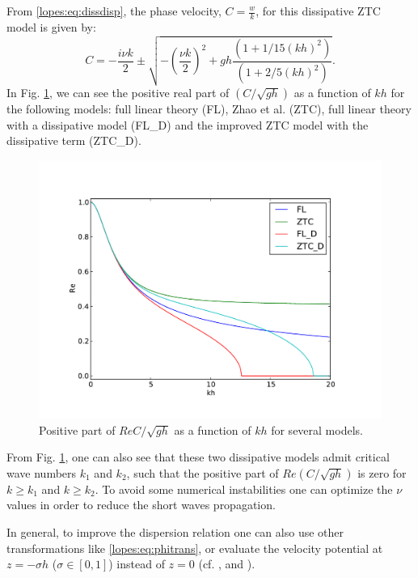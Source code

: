 From \eqref{lopes:eq:dissdisp}, the
 phase velocity, \(\displaystyle C=\frac{w}{k}\),  for this dissipative ZTC model is
 given by:
\begin{equation}
C=-\frac{i\nu k}{2}\pm\sqrt{-\left(\frac{\nu k}{2}\right)^2+gh\frac{(1+1/15(kh)^2)}{(1+2/5(kh)^2)}}.
\end{equation}
In Fig. \ref{lopes:fig:dispersion}, we can see the positive real
part
of \(\displaystyle\left(C/\sqrt{gh}\right)\) as a function of \(kh\) for the following models:
  full linear theory (FL),
Zhao et al. (ZTC), full linear theory with a
dissipative model (FL\_D) and the
improved  ZTC model with the dissipative term (ZTC\_D).
\begin{figure}[htb]
  \begin{center}
    \includegraphics[width=\largefig]{chapters/lopes/pdf/dispersion.pdf}
    \caption{Positive  part of $Re C/ \sqrt{gh}$ as a function of $kh$ for several models.}
    \label{lopes:fig:dispersion}
  \end{center}
\end{figure}
From Fig. \ref{lopes:fig:dispersion}, one can also see that
  these two dissipative models  admit
critical wave numbers \(k_1\) and \(k_2\),
such that the positive  part of \(\displaystyle Re\left(C/\sqrt{gh}\right)\) is zero
for \(k\geq k_1\) and \(k\geq k_2\).
To avoid some numerical instabilities one can optimize
 the \(\nu\) values in order
 to reduce  the short waves propagation.


In general, to improve the dispersion relation one can also use other
 transformations like \eqref{lopes:eq:phitrans}, or evaluate the
 velocity potential at \(z=-\sigma h\) (\(\sigma\in[0,1]\))
 instead of  \(z=0\) (cf. \cite{BinghamMadsenEtAl2008}, \cite{MadsenAgnon2003} and \cite{MadsenBinghamEtAl2003}).

